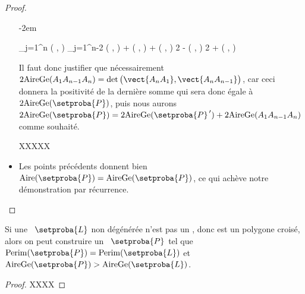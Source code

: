 \begin{proof}
\begin{itemize}
		\leavevmode\kern-2em%
		\begin{stepcalc}[style=ar*]
			 
			\dsum_{j=1}^{n} \det \big(  ,   \big)
		\explnext{}
			\dsum_{j=1}^{n-2} \det \big(  ,  \big)
			+
			\det \big(  ,   \big)
			+
			\det \big(  ,   \big)
		          {}
			2 
			-
			\det \big(  ,  \big)
		\explnext{}
			2 
			+
			\det \big(  ,  \big)
		\end{stepcalc}
		
		\noindent
		Il faut donc justifier que nécessairement 
		$2 \garea{A_1 A_{n-1} A_n} = \det \big( \vect{A_n A_1} , \vect{A_n A_{n-1}} \big)$,
		car ceci donnera la positivité de la dernière somme qui sera donc égale à $2 \garea{\setproba{P}}$, puis nous aurons 
		$2 \garea{\setproba{P}} = 2 \garea{\setproba{P}^{\,\prime}} + 2 \garea{A_1 A_{n-1} A_n}$ 
		comme souhaité.
		
		
		
		XXXXX


    	\item Les points précédents donnent bien $\area{\setproba{P}} = \garea{\setproba{P}}$, ce qui achève notre démonstration par récurrence.
    \end{itemize}
\end{proof}




\begin{fact} \label{no-cross-max}
    Si une \nline\ $\setproba{L}$ non dégénérée n'est pas un \ngone, donc est un polygone croisé, alors on peut construire un \ngone\ $\setproba{P}$ tel que 
	$\perim{\setproba{P}} = \perim{\setproba{L}}$ 
	et 
	$\garea{\setproba{P}} > \garea{\setproba{L}}$.
\end{fact}


\begin{proof}
	XXXX
\end{proof}



